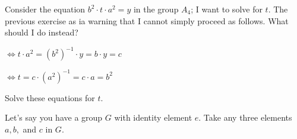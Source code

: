 \begin{questions}
	\question Consider the equation $b^2\cdot t\cdot a^2 = y$ in the group $A_4$; I want to solve for $t$. The previous exercise as ia warning that I cannot simply proceed as follows. What should I do instead?
	\begin{solution}
		\par $\Leftrightarrow t\cdot a^2 = (b^2)^{-1}\cdot y = b\cdot y = c$
		\par $\Leftrightarrow t = c\cdot (a^2)^{-1} = c\cdot a = b^2$
	\end{solution}

	\question Solve these equations for $t$.

	\question Let's say you have a group $G$ with identity element $e$. Take any three elements $a,b,$ and $c$ in $G$.
\end{questions}
